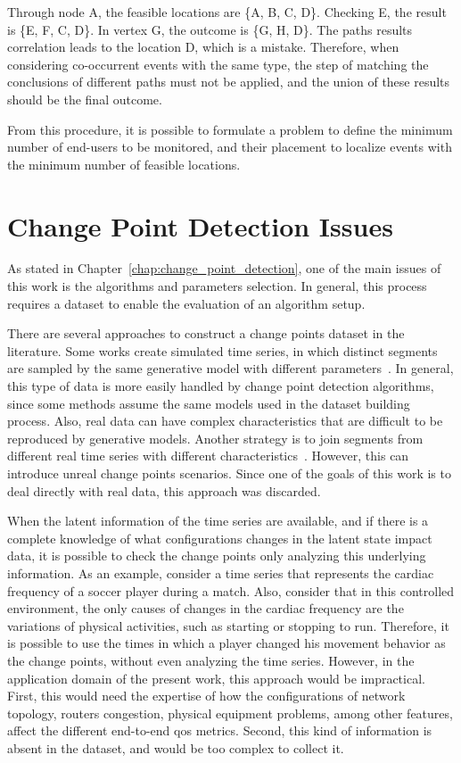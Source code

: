 Through node A, the feasible locations are \{A, B, C, D\}.
Checking E, the result is \{E, F, C, D\}.
In vertex G, the outcome is \{G, H, D\}.
The paths results correlation leads to the location D, which is a mistake.
Therefore, when considering co-occurrent events with the same type, the step of
matching the conclusions of different paths must not be applied, and the
union of these results should be the final outcome.

From this procedure, it is possible to formulate a
problem to define the minimum number of end-users to be monitored, and their
placement to localize events with the minimum number of feasible locations.

\section{Change Point Detection Issues}

As stated in Chapter~\ref{chap:change_point_detection}, one of the main issues
of this work is the algorithms and parameters selection.
In general, this process requires a dataset to enable the evaluation of an
algorithm setup.

There are several approaches to construct a
change points dataset in the literature.
Some works create simulated time series, in which distinct segments are sampled
by the same generative model with different
parameters~\cite{change_point_detection_in_time_series_data_by_relative_density_ratio_estimation}.
In general, this type of data is more easily handled by change point detection
algorithms, since some methods assume the same models used in the dataset
building process. Also, real data can have complex characteristics that are
difficult to be reproduced by generative models. Another strategy is to join
segments from different real time series with different
characteristics~\cite{inertial_hidden_markov_models_modeling_change_in_multivariate_time_series}.
However, this can introduce unreal change points scenarios. Since one of
the goals of this work is to deal directly with real data,
this approach was discarded.

When the latent information of the time series are available, and if there is a
complete knowledge of what configurations changes in the latent state impact
data, it is possible to check the change points only analyzing this underlying
information. As an example, consider a time series that represents the cardiac
frequency of a soccer player during a match. Also, consider that in this
controlled environment, the only causes of changes in the cardiac frequency are
the variations of physical activities, such as starting or stopping to run.
Therefore,
it is possible to use the times in which a player changed his movement behavior
as the change points, without even analyzing the time series. However, in the
application domain of the present work, this approach would be impractical.
First, this would need the expertise of how the configurations of network
topology, routers congestion, physical equipment problems, among other features,
affect the different end-to-end \gls*{qos} metrics.
Second, this kind of information is absent in the dataset, and would be too
complex to collect it.

